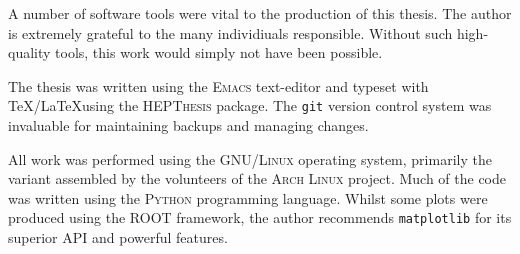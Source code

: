 


\begin{colophon}
  A number of software tools were vital to the production of this thesis. The
  author is extremely grateful to the many individiuals responsible. Without
  such high-quality tools, this work would simply not have been possible.

The thesis was written using the \textsc{Emacs} text-editor and typeset with
\TeX/\LaTeX using the \textsc{HEPThesis} package. The \texttt{git} version
control system was invaluable for maintaining backups and managing changes.

All work was performed using the \textsc{GNU/Linux} operating system, primarily
the variant assembled by the volunteers of the \textsc{Arch Linux} project. Much
of the code was written using the \textsc{Python} programming language. Whilst
some plots were produced using the \textsc{ROOT} framework, the author
recommends \texttt{matplotlib} for its superior API and powerful features.
\end{colophon}
